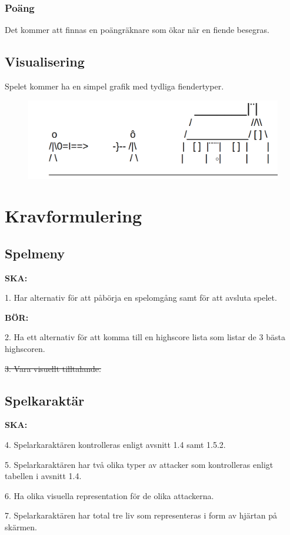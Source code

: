 \documentclass{TDP005mall}
\begin{document}
\subsubsection{Poäng}
Det kommer att finnas en poängräknare som ökar när en fiende besegras. 

\subsection{Visualisering}
Spelet kommer ha en simpel grafik med tydliga fiendertyper.
\begin{figure}[h!]
  \includegraphics[width=\linewidth]{Visual.png}
\end{figure}
  
\section{Kravformulering}
\subsection{Spelmeny}
\textbf{SKA:}

1. Har alternativ för att påbörja en spelomgång samt för att avsluta spelet.

\textbf{BÖR:}

2. Ha ett alternativ för att komma till en highscore lista som listar de 3 bästa highscoren.

\sout{3. Vara visuellt tilltalande.}
\subsection{Spelkaraktär}
\textbf{SKA:}

4. Spelarkaraktären kontrolleras enligt avsnitt 1.4 samt 1.5.2.

5. Spelarkaraktären har två olika typer av attacker som kontrolleras enligt tabellen i avsnitt 1.4.

6. Ha olika visuella representation för de olika attackerna.

7. Spelarkaraktären har total tre liv som representeras i form av hjärtan på skärmen.
\end{document}
